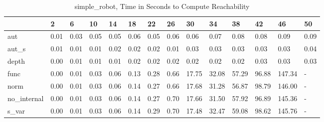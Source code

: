 \begin{table}
\caption{simple_robot, Time in Seconds to Compute Reachability}
\label{simple_robot_states_time}
\begin{tabular}{llllllllllllll}
\toprule
 & 2 & 6 & 10 & 14 & 18 & 22 & 26 & 30 & 34 & 38 & 42 & 46 & 50 \\
\midrule
aut & 0.01 & 0.03 & 0.05 & 0.05 & 0.06 & 0.05 & 0.06 & 0.06 & 0.07 & 0.08 & 0.08 & 0.09 & 0.09 \\
aut_s & 0.01 & 0.01 & 0.01 & 0.02 & 0.02 & 0.02 & 0.01 & 0.03 & 0.03 & 0.03 & 0.03 & 0.03 & 0.04 \\
depth & 0.00 & 0.01 & 0.01 & 0.01 & 0.02 & 0.02 & 0.02 & 0.02 & 0.02 & 0.02 & 0.03 & 0.03 & 0.03 \\
func & 0.00 & 0.01 & 0.03 & 0.06 & 0.13 & 0.28 & 0.66 & 17.75 & 32.08 & 57.29 & 96.88 & 147.34 & - \\
norm & 0.00 & 0.01 & 0.03 & 0.06 & 0.14 & 0.27 & 0.66 & 17.68 & 31.28 & 56.87 & 98.79 & 146.00 & - \\
no_internal & 0.00 & 0.01 & 0.03 & 0.06 & 0.14 & 0.27 & 0.70 & 17.66 & 31.50 & 57.92 & 96.89 & 145.36 & - \\
s_var & 0.00 & 0.01 & 0.03 & 0.06 & 0.14 & 0.29 & 0.70 & 17.48 & 32.47 & 59.08 & 98.62 & 145.76 & - \\
\bottomrule
\end{tabular}
\end{table}
